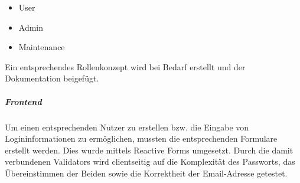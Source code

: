 \begin{itemize}
	\item User
	\item Admin
	\item Maintenance
\end{itemize}

Ein entsprechendes Rollenkonzept wird bei Bedarf erstellt und der Dokumentation beigefügt. 

\subparagraph{Frontend}

Um einen entsprechenden Nutzer zu erstellen bzw. die Eingabe von Logininformationen zu ermöglichen, mussten die entsprechenden Formulare erstellt werden. Dies wurde mittels Reactive Forms umgesetzt. Durch die damit verbundenen Validators wird clientseitig auf die Komplexität des Passworts, das Übereinstimmen der Beiden sowie die Korrektheit der Email-Adresse getestet. 

